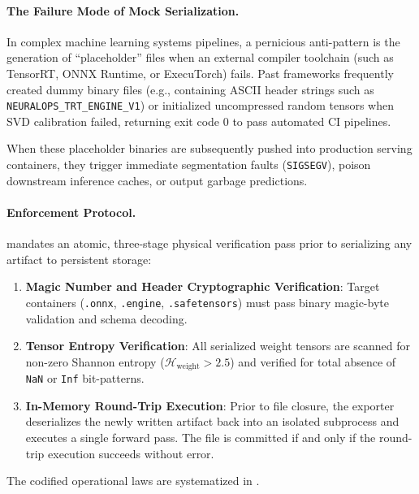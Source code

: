 \paragraph{The Failure Mode of Mock Serialization.}
In complex machine learning systems pipelines, a pernicious anti-pattern is the generation of ``placeholder'' files when an external compiler toolchain (such as TensorRT, ONNX Runtime, or ExecuTorch) fails. Past frameworks frequently created dummy binary files (e.g., containing ASCII header strings such as \texttt{NEURALOPS\_TRT\_ENGINE\_V1}) or initialized uncompressed random tensors when SVD calibration failed, returning exit code 0 to pass automated CI pipelines.

When these placeholder binaries are subsequently pushed into production serving containers, they trigger immediate segmentation faults (\texttt{SIGSEGV}), poison downstream inference caches, or output garbage predictions.

\paragraph{Enforcement Protocol.}
\neuralops{} mandates an atomic, three-stage physical verification pass prior to serializing any artifact to persistent storage:
\begin{enumerate}
    \item \textbf{Magic Number and Header Cryptographic Verification}: Target containers (\texttt{.onnx}, \texttt{.engine}, \texttt{.safetensors}) must pass binary magic-byte validation and schema decoding.
    \item \textbf{Tensor Entropy Verification}: All serialized weight tensors are scanned for non-zero Shannon entropy ($\mathcal{H}_{\text{weight}} > 2.5$) and verified for total absence of \texttt{NaN} or \texttt{Inf} bit-patterns.
    \item \textbf{In-Memory Round-Trip Execution}: Prior to file closure, the exporter deserializes the newly written artifact back into an isolated subprocess and executes a single forward pass. The file is committed if and only if the round-trip execution succeeds without error.
\end{enumerate}

The codified operational laws are systematized in .

